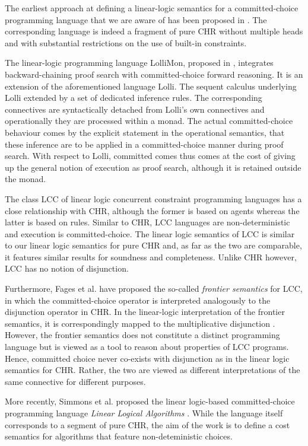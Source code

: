 \documentclass[acmtocl]{acmtrans2m}
\begin{document}
The earliest approach at defining a linear-logic semantics for a
committed-choice programming language that we are aware of has been proposed in
\cite{DBLP:conf/kgc/Zlatuska93}. The corresponding language is indeed a fragment
of pure CHR without multiple heads and with substantial restrictions on the use
of built-in constraints.

The linear-logic programming language LolliMon, proposed in
\cite{DBLP:conf/ppdp/LopezPPW05}, integrates backward-chaining proof search with
committed-choice forward reasoning. It is an extension of the aforementioned
language Lolli. The sequent calculus underlying Lolli extended by a set of
dedicated inference rules. The corresponding connectives are syntactically
detached from Lolli's own connectives and operationally they are processed within
a monad. The actual committed-choice behaviour comes by the explicit statement in
the operational semantics, that these inference are to be applied in a
committed-choice manner during proof search. With respect to Lolli, committed
comes thus comes at the cost of giving up the general notion of execution as
proof search, although it is retained outside the monad.

The class LCC of linear logic concurrent constraint programming languages
\cite{DBLP:journals/iandc/FagesRS01} has a close relationship with CHR, although
the former is based on agents whereas the latter is based on rules. Similar to
CHR, LCC languages are non-deterministic and execution is committed-choice. The
linear logic semantics of LCC is similar to our linear logic semantics for pure
CHR and, as far as the two are comparable, it features similar results for
soundness and completeness. Unlike CHR however, LCC has no notion of
disjunction.

Furthermore, Fages et al. have proposed the so-called
\emph{frontier semantics}\cite{DBLP:journals/iandc/FagesRS01} for LCC, in which
the committed-choice operator is interpreted analogously to the
disjunction operator  in CHR. In the linear-logic interpretation of
the frontier semantics, it is correspondingly mapped to the multiplicative
disjunction . However, the frontier semantics does not constitute a distinct
programming language but is viewed as a tool to reason about properties of LCC
programs. Hence, committed choice never co-exists with disjunction as in the
linear logic semantics for CHR. Rather, the two are viewed as different
interpretations of the same connective for different purposes.

More recently, Simmons et al. proposed the linear logic-based committed-choice
programming language \emph{Linear Logical Algorithms}
\cite{DBLP:conf/icalp/SimmonsP08}. While the language itself corresponds to a
segment of pure CHR, the aim of the work is to define a cost semantics for
algorithms that feature non-deteministic choices.
\end{document}
